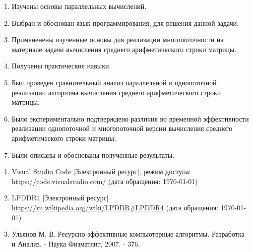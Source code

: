 \begin{enumerate}
	\item Изучены основы параллельных вычислений.
	\item Выбран и обоснован язык программирования, для решения данной задачи.
	\item Примененены изученные основы для реализации многопоточности на материале задачи вычисления среднего арифметического строки матрицы.
	\item Получены практические навыки.
	\item Был проведен сравнительный анализ параллельной и однопоточной реализации алгоритма вычисления среднего арифметического строки матрицы.
	\item Было экспериментально подтверждено различия во временной эффективности реализации однопоточной и многопоточной версии вычисления среднего арифметического строки матрицы.
	\item Были описаны и обоснованы полученные результаты.
\end{enumerate}


\begin{enumerate}
	\item Visual Studio Code [Электронный ресурс], режим доступа: https://code.visualstudio.com/ (дата обращения: \today)
	\item LPDDR4 [Электронный ресурс] \url{https://ru.wikipedia.org/wiki/LPDDR#LPDDR4} (дата обращения: \today)
	\item Ульянов М. В. Ресурсно-эффективные компьютерные алгоритмы. Разработка и Анализ. - Наука Физматлит, 2007. - 376.
\end{enumerate}


